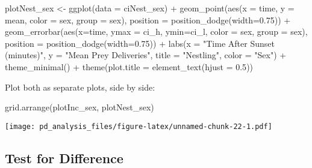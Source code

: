 \documentclass[
]{article}
\newenvironment{Shaded}{\begin{snugshade}}{\end{snugshade}}
\newcommand{\AttributeTok}[1]{\textcolor[rgb]{0.77,0.63,0.00}{#1}}
\newcommand{\FloatTok}[1]{\textcolor[rgb]{0.00,0.00,0.81}{#1}}
\newcommand{\FunctionTok}[1]{\textcolor[rgb]{0.00,0.00,0.00}{#1}}
\newcommand{\NormalTok}[1]{#1}
\newcommand{\OtherTok}[1]{\textcolor[rgb]{0.56,0.35,0.01}{#1}}
\newcommand{\SpecialCharTok}[1]{\textcolor[rgb]{0.00,0.00,0.00}{#1}}
\newcommand{\StringTok}[1]{\textcolor[rgb]{0.31,0.60,0.02}{#1}}
\begin{document}
\begin{Shaded}
\begin{Highlighting}[]
\NormalTok{plotNest\_sex }\OtherTok{\textless{}{-}} \FunctionTok{ggplot}\NormalTok{(}\AttributeTok{data =}\NormalTok{ ciNest\_sex) }\SpecialCharTok{+}
  \FunctionTok{geom\_point}\NormalTok{(}\FunctionTok{aes}\NormalTok{(}\AttributeTok{x =}\NormalTok{ time, }\AttributeTok{y =}\NormalTok{ mean, }\AttributeTok{color =}\NormalTok{ sex, }\AttributeTok{group =}\NormalTok{ sex),}
             \AttributeTok{position =} \FunctionTok{position\_dodge}\NormalTok{(}\AttributeTok{width=}\FloatTok{0.75}\NormalTok{)) }\SpecialCharTok{+}
  \FunctionTok{geom\_errorbar}\NormalTok{(}\FunctionTok{aes}\NormalTok{(}\AttributeTok{x=}\NormalTok{time, }\AttributeTok{ymax =}\NormalTok{ ci\_h, }\AttributeTok{ymin=}\NormalTok{ci\_l, }\AttributeTok{color =}\NormalTok{ sex, }
                    \AttributeTok{group =}\NormalTok{ sex),}
                \AttributeTok{position =} \FunctionTok{position\_dodge}\NormalTok{(}\AttributeTok{width=}\FloatTok{0.75}\NormalTok{)) }\SpecialCharTok{+}
  \FunctionTok{labs}\NormalTok{(}\AttributeTok{x =} \StringTok{"Time After Sunset (minutes)"}\NormalTok{, }\AttributeTok{y =} \StringTok{"Mean Prey Deliveries"}\NormalTok{, }
       \AttributeTok{title =} \StringTok{"Nestling"}\NormalTok{, }\AttributeTok{color =} \StringTok{"Sex"}\NormalTok{) }\SpecialCharTok{+}
  \FunctionTok{theme\_minimal}\NormalTok{() }\SpecialCharTok{+}
  \FunctionTok{theme}\NormalTok{(}\AttributeTok{plot.title =} \FunctionTok{element\_text}\NormalTok{(}\AttributeTok{hjust =} \FloatTok{0.5}\NormalTok{))}
\end{Highlighting}
\end{Shaded}

Plot both as separate plots, side by side:

\begin{Shaded}
\begin{Highlighting}[]
\FunctionTok{grid.arrange}\NormalTok{(plotInc\_sex, plotNest\_sex)}
\end{Highlighting}
\end{Shaded}

\texttt{[image: pd\_analysis\_files/figure-latex/unnamed-chunk-22-1.pdf]}

\hypertarget{test-for-difference}{%
\subsection{Test for Difference}\label{test-for-difference}}
\end{document}
